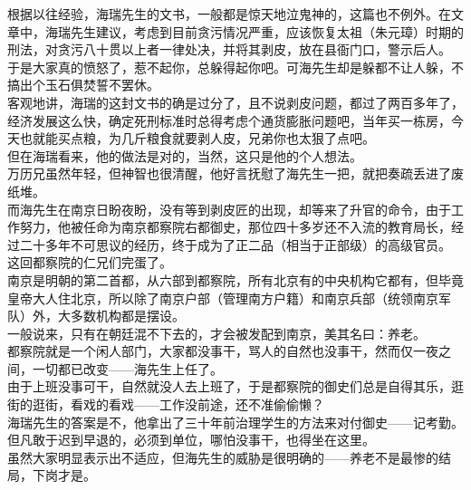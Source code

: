 \begin{multicols}{\theparacolNo}
根据以往经验，海瑞先生的文书，一般都是惊天地泣鬼神的，这篇也不例外。在文章中，海瑞先生建议，考虑到目前贪污情况严重，应该恢复太祖（朱元璋）时期的刑法，对贪污八十贯以上者一律处决，并将其剥皮，放在县衙门口，警示后人。\\

于是大家真的愤怒了，惹不起你，总躲得起你吧。可海先生却是躲都不让人躲，不搞出个玉石俱焚誓不罢休。\\

客观地讲，海瑞的这封文书的确是过分了，且不说剥皮问题，都过了两百多年了，经济发展这么快，确定死刑标准时总得考虑个通货膨胀问题吧，当年买一栋房，今天也就能买点粮，为几斤粮食就要剥人皮，兄弟你也太狠了点吧。\\

但在海瑞看来，他的做法是对的，当然，这只是他的个人想法。\\

万历兄虽然年轻，但神智也很清醒，他好言抚慰了海先生一把，就把奏疏丢进了废纸堆。\\

而海先生在南京日盼夜盼，没有等到剥皮匠的出现，却等来了升官的命令，由于工作努力，他被任命为南京都察院右都御史，那位四十多岁还不入流的教育局长，经过二十多年不可思议的经历，终于成为了正二品（相当于正部级）的高级官员。\\

这回都察院的仁兄们完蛋了。\\

南京是明朝的第二首都，从六部到都察院，所有北京有的中央机构它都有，但毕竟皇帝大人住北京，所以除了南京户部（管理南方户籍）和南京兵部（统领南京军队）外，大多数机构都是摆设。\\

一般说来，只有在朝廷混不下去的，才会被发配到南京，美其名曰：养老。\\

都察院就是一个闲人部门，大家都没事干，骂人的自然也没事干，然而仅一夜之间，一切都已改变——海先生上任了。\\

由于上班没事可干，自然就没人去上班了，于是都察院的御史们总是自得其乐，逛街的逛街，看戏的看戏——工作没前途，还不准偷偷懒？\\

海瑞先生的答案是不，他拿出了三十年前治理学生的方法来对付御史——记考勤。但凡敢于迟到早退的，必须到单位，哪怕没事干，也得坐在这里。\\

虽然大家明显表示出不适应，但海先生的威胁是很明确的——养老不是最惨的结局，下岗才是。\\


\end{multicols}
